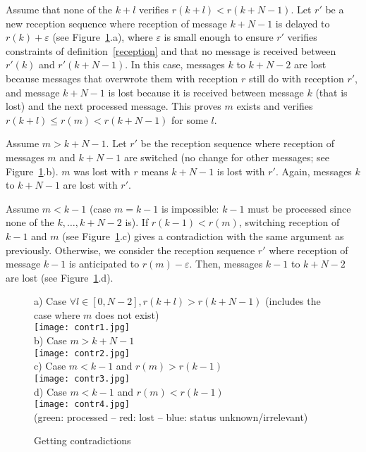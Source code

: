 Assume that none of the $k+l$ verifies $r(k+l) < r(k+N -1)$. Let $r'$ be a new reception sequence where reception of message $k+N-1$ is delayed to $r(k) + \varepsilon$ (see Figure~\ref{contr}.a),
where $\varepsilon$ is small enough to ensure $r'$ verifies constraints of definition~\ref{reception} and that no message is received between $r'(k)$ and $r'(k+N-1)$.
In this case, messages $k$ to $k+N-2$ are lost because messages that overwrote them with reception $r$ still do with reception $r'$, and message $k+N-1$ is lost because it is received between message $k$ (that is lost) and the next processed message.
This proves $m$ exists and verifies $r(k+l) \leq r(m) < r(k+N-1)$ for some $l$.

Assume $m > k+N-1$. Let $r'$ be the reception sequence where reception of messages $m$ and $k+N-1$ are switched (no change for other messages; see Figure~\ref{contr}.b). $m$ was lost with $r$ means $k+N-1$ is lost with $r'$. Again, messages $k$ to $k+N-1$ are lost with $r'$.

Assume $m < k-1$ (case $m=k-1$ is impossible: $k-1$ must be processed since none of the $k,\dots,k+N-2$ is). If $r(k-1) < r(m)$, switching reception of $k-1$ and $m$ (see Figure~\ref{contr}.c) gives a contradiction with the same argument as previously.
Otherwise, we consider the reception sequence $r'$ where reception of message $k-1$ is anticipated to $r(m)-\varepsilon$. Then, messages $k-1$ to $k+N-2$ are lost (see Figure~\ref{contr}.d).

\begin{figure}[h]
\begin{center}
a) Case $\forall l \in [0, N-2], r(k + l) > r(k+N-1)$ (includes the case where $m$ does not exist)\\
\texttt{[image: contr1.jpg]}\\
b) Case $m > k+N-1$\\
\texttt{[image: contr2.jpg]}\\
c) Case $m < k-1$ and $r(m) > r(k-1)$\\
\texttt{[image: contr3.jpg]}\\
d) Case $m < k-1$ and $r(m) < r(k-1)$\\
\texttt{[image: contr4.jpg]}\\
(green: processed -- red: lost -- blue: status unknown/irrelevant)
\caption{Getting contradictions}\label{contr}
\end{center}
\end{figure}

